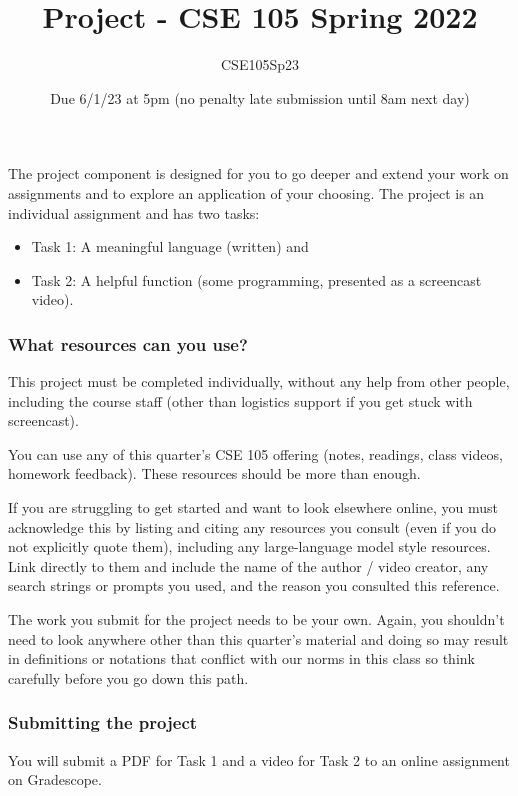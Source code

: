 \documentclass[12pt, oneside]{article}
\author{CSE105Sp23}
\title{Project - CSE 105 Spring 2022}
\date{Due 6/1/23 at 5pm (no penalty late submission until 8am next day)}
\begin{document}
\maketitle

\thispagestyle{fancy}

The project component is designed for you to go deeper and extend your work on assignments 
and to explore an application of your choosing. 
The project is an individual assignment and has 
two tasks: 
\begin{itemize}
    \item Task 1: A meaningful language (written) and \item Task 2: A helpful function (some programming, presented as a screencast video).
\end{itemize}
\vspace{-20pt}


\subsubsection*{What resources can you use?}
This project must be completed individually, without any help from other people, 
including the course staff (other than logistics support if you get stuck with screencast). 

You can use any of this quarter's CSE 105 offering (notes, readings, class videos, homework feedback). 
These resources should be more than enough. 

If you are struggling to get started and want to 
look elsewhere online, you must acknowledge this by listing and 
citing any resources you consult 
(even if you do not explicitly quote them), including any large-language model style resources. 
Link directly to them and include the name of the 
author / video creator, any search strings or prompts you used, and the reason you consulted this reference. 

The work you submit for 
the project needs to be your own. Again, you shouldn't need to look anywhere other 
than this quarter's material and doing so may result in definitions or notations 
that conflict with our norms in this class so think carefully before you go down this path.

\subsubsection*{Submitting the project}
You will submit a PDF for Task 1 and a video for Task 2 
to an online assignment on Gradescope.
\end{document}
